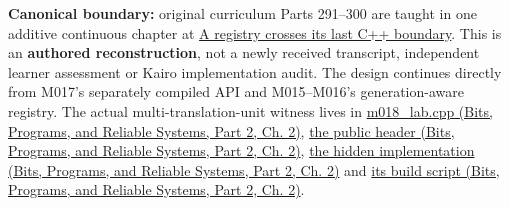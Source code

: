 \hypertarget{appendix-fd090d982a15-m018-parts-291300-the-same-asset-service-becomes-a-typed-hidden-and-measurable-engine-api}{}

\textbf{Canonical boundary:} original curriculum Parts 291--300 are taught in one additive continuous chapter at \hyperref[01-foundations-i-ch007-a-registry-crosses-its-last-c-boundary-hidden-implementation-typed-identity-and-measured-abstraction-cost]{A registry crosses its last C++ boundary}. This is an \textbf{authored reconstruction}, not a newly received transcript, independent learner assessment or Kairo implementation audit. The design continues directly from M017's separately compiled API and M015--M016's generation-aware registry. The actual multi-translation-unit witness lives in \href{../01-Bits-Programs-and-Reliable-Systems-P02/main.pdf\#source-file-8aedc3fdcd10c91971507448}{m018\_lab.cpp (Bits, Programs, and Reliable Systems, Part 2, Ch. 2)}, \href{../01-Bits-Programs-and-Reliable-Systems-P02/main.pdf\#source-file-0529c78555b675a2ae111228}{the public header (Bits, Programs, and Reliable Systems, Part 2, Ch. 2)}, \href{../01-Bits-Programs-and-Reliable-Systems-P02/main.pdf\#source-file-04abded74b7e03edc5dcf870}{the hidden implementation (Bits, Programs, and Reliable Systems, Part 2, Ch. 2)} and \href{../01-Bits-Programs-and-Reliable-Systems-P02/main.pdf\#source-file-c936569afa19be638ec87991}{its build script (Bits, Programs, and Reliable Systems, Part 2, Ch. 2)}.

